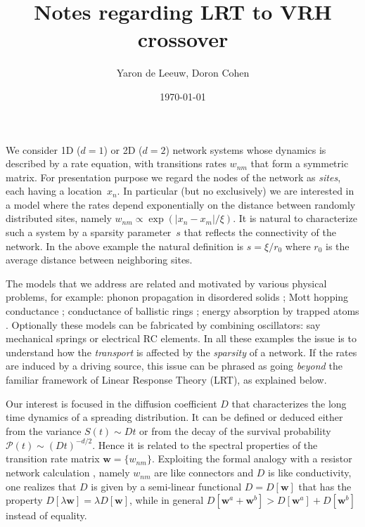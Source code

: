 \documentclass[onecolumn,fleqn,notitlepage,secnumarabic]{revtex4}
\begin{document}
\title{Notes regarding LRT to VRH crossover}

\author{Yaron de Leeuw, Doron Cohen}
\date{\today}
\maketitle


We consider 1D ($d{=}1$) or 2D ($d{=}2$) network systems whose dynamics is described 
by a rate equation, with transitions rates $w_{nm}$ that form a symmetric matrix.
For presentation purpose we regard the nodes of the network as {\em sites}, 
each having a location~$x_n$. In particular (but no exclusively) we are interested 
in a model where the rates depend exponentially on the distance 
between randomly distributed sites, namely $w_{nm}\propto \exp(|x_n-x_m|/\xi)$. 
It is natural to characterize such a system by a sparsity parameter~$s$ 
that reflects the connectivity of the network. In the above example 
the natural definition is $s=\xi/r_0$ where $r_0$ is the average distance 
between neighboring sites. 

The models that we address are related and motivated  
by various physical problems, for example: 
phonon propagation in disordered solids \cite{phn1,phn2,amir}; 
Mott hopping conductance \cite{mott,miller,AHL,pollak,VRHbook};
conductance of ballistic rings \cite{kbd};
energy absorption by trapped atoms \cite{kbw}. 
Optionally these models can be fabricated by combining oscillators: 
say mechanical springs or electrical RC elements.    
In all these examples the issue is to understand how 
the {\em transport} is affected by the {\em sparsity} of a network.  
If the rates are induced by a driving source, this issue can be phrased as  
going {\em beyond} the familiar framework of Linear Response Theory (LRT), 
as explained below.  

Our interest is focused in the diffusion coefficient $D$ that characterizes the 
long time dynamics of a spreading distribution. It can be defined or deduced 
either from the variance ${S(t) \sim Dt}$ or from the decay of the 
survival probability ${\mathcal{P}(t) \sim (D t)^{-d/2}}$. Hence it is 
related to the spectral properties of the transition rate matrix ${\bm{w}=\{w_{nm}\}}$.
Exploiting the formal analogy with a resistor network calculation \cite{miller},  
namely $w_{nm}$ are like connectors and $D$ is like conductivity, 
one realizes that $D$ is given by a semi-linear functional $D=D[\bm{w}]$ 
that has the property ${D[\lambda \bm{w}] = \lambda D[\bm{w}]}$, 
while in general ${D[\bm{w}^a+\bm{w}^b] > D[\bm{w}^a]+D[\bm{w}^b]}$ instead of equality.      
\end{document}
